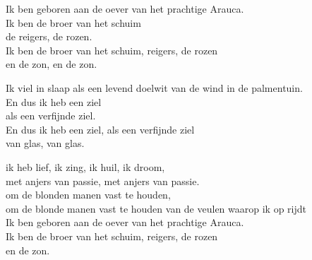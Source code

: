 \clearpage
\begin{translation}
Ik ben geboren aan de oever van het prachtige Arauca.\\
Ik ben de broer van het schuim\\
de reigers, de rozen.\\
Ik ben de broer van het schuim, reigers, de rozen\\
en de zon, en de zon.\vspace{\wlskip}

Ik viel in slaap als een levend doelwit van de wind in de palmentuin.\\
En dus ik heb een ziel\\
als een verfijnde ziel.\\
En dus ik heb een ziel, als een verfijnde ziel\\
van glas, van glas.\vspace{\wlskip}

ik heb lief, ik zing, ik huil, ik droom,\\
met anjers van passie, met anjers van passie.\\
om de blonden manen vast te houden,\\
om de blonde manen vast te houden van de veulen waarop ik op rijdt\\
Ik ben geboren aan de oever van het prachtige Arauca.\\
Ik ben de broer van het schuim, reigers, de rozen\\
en de zon.
\end{translation}



